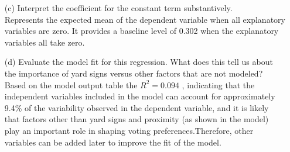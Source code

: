 \documentclass[12pt,letterpaper]{article}
\begin{document}
\begin{enumerate}
	\vspace{7cm}
	\item [(c)] Interpret the coefficient for the constant term substantively.
	\vspace{10mm}\\
	Represents the expected mean of the dependent variable when all explanatory variables are zero. It provides a baseline level of 0.302 when the explanatory variables all take zero.

	
	\newpage
	\item [(d)] Evaluate the model fit for this regression.  What does this	tell us about the importance of yard signs versus other factors that are not modeled?
	\vspace{10mm}\\
    Based on the model output table the $R^2 = 0.094$ , indicating that the independent variables included in the model can account for approximately 9.4\% of the variability observed in the dependent variable, and it is likely that factors other than yard signs and proximity (as shown in the model) play an important role in shaping voting preferences.Therefore, other variables can be added later to improve the fit of the model.
\end{enumerate}  
\end{document}
